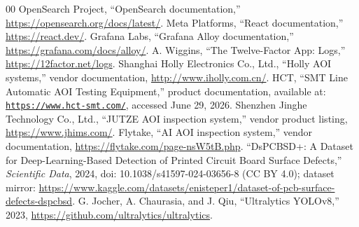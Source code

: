 \documentclass[12pt,a4paper]{article}
\begin{document}
\begin{thebibliography}{00}
 OpenSearch Project, ``OpenSearch documentation,'' \url{https://opensearch.org/docs/latest/}.
 Meta Platforms, ``React documentation,'' \url{https://react.dev/}.
 Grafana Labs, ``Grafana Alloy documentation,'' \url{https://grafana.com/docs/alloy/}.
 A. Wiggins, ``The Twelve-Factor App: Logs,'' \url{https://12factor.net/logs}.
 Shanghai Holly Electronics Co., Ltd., ``Holly AOI systems,'' vendor documentation, \url{http://www.iholly.com.cn/}.
 HCT, ``SMT Line Automatic AOI Testing Equipment,'' product documentation, available at: \href{https://www.hct-smt.com/products/aoi-testing-equipment/smt-line-automatic-aoi-testing-equipment}{\nolinkurl{https://www.hct-smt.com/}}, accessed June 29, 2026.
 Shenzhen Jinghe Technology Co., Ltd., ``JUTZE AOI inspection system,'' vendor product listing, \url{https://www.jhims.com/}.
 Flytake, ``AI AOI inspection system,'' vendor documentation, \url{https://flytake.com/page-nsW5tB.php}.
 ``DsPCBSD+: A Dataset for Deep-Learning-Based Detection of Printed Circuit Board Surface Defects,'' \textit{Scientific Data}, 2024, doi: 10.1038/s41597-024-03656-8 (CC BY 4.0); dataset mirror: \url{https://www.kaggle.com/datasets/enisteper1/dataset-of-pcb-surface-defects-dspcbsd}.
 G. Jocher, A. Chaurasia, and J. Qiu, ``Ultralytics YOLOv8,'' 2023, \url{https://github.com/ultralytics/ultralytics}.
\end{thebibliography}
\end{document}
